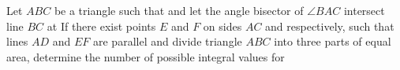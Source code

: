 Let $ABC$ be a triangle such that  and let the angle bisector of $\angle BAC$ intersect line $BC$ at  If there exist points $E$ and $F$ on sides $AC$ and  respectively, such that lines $AD$ and $EF$ are parallel and divide triangle $ABC$ into three parts of equal area, determine the number of possible integral values for 